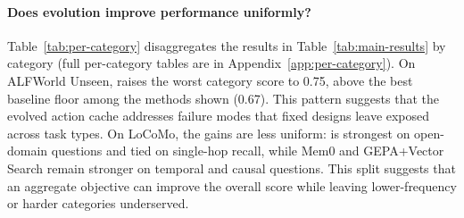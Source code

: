 \paragraph{Does evolution improve performance uniformly?}



Table~\ref{tab:per-category} disaggregates the results in Table~\ref{tab:main-results} by category (full per-category tables are in Appendix~\ref{app:per-category}).
On ALFWorld Unseen, \sysname{} raises the worst category score to 0.75, above the best baseline floor among the methods shown (0.67).
This pattern suggests that the evolved action cache addresses failure modes that fixed designs leave exposed across task types.
On LoCoMo, the gains are less uniform: \sysname{} is strongest on open-domain questions and tied on single-hop recall, while Mem0 and GEPA+Vector Search remain stronger on temporal and causal questions.
This split suggests that an aggregate objective can improve the overall score while leaving lower-frequency or harder categories underserved.
